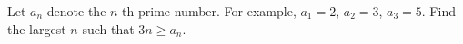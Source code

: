 Let $a_{n}$ denote the $n$-th prime number. For example, $a_{1}=2$, $a_{2}=3$, $a_{3}=5$. Find the largest $n$ such that $3n \geqslant a_{n}$.
